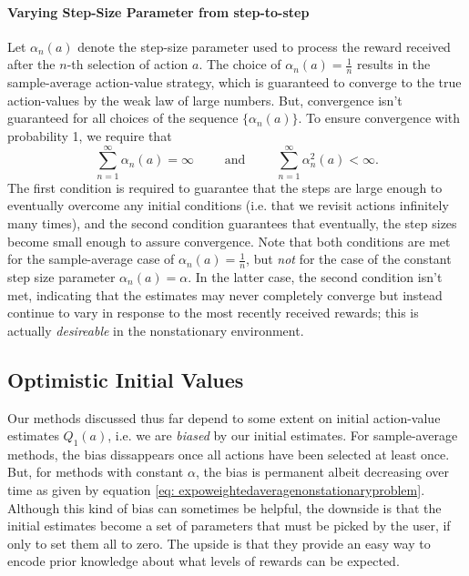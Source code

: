 \documentclass[12pt]{article}
\begin{document}
\paragraph{Varying Step-Size Parameter from step-to-step} Let $\alpha_n(a)$ denote the step-size parameter used to process the reward received after the $n$-th selection of action $a$. The choice of $\alpha_n(a) = \frac{1}{n}$ results in the sample-average action-value strategy, which is guaranteed to converge to the true action-values by the weak law of large numbers. But, convergence isn't guaranteed for all choices of the sequence $\{\alpha_n(a)\}$. To ensure convergence with probability 1, we require that
\begin{equation}
  \sum_{n=1}^{\infty} \alpha_n(a) = \infty \hspace{25pt} \textrm{ and } \hspace{25pt} \sum_{n=1}^{\infty} \alpha_n^2(a) < \infty.
\end{equation}
The first condition is required to guarantee that the steps are large enough to eventually overcome any initial conditions (i.e. that we revisit actions infinitely many times), and the second condition guarantees that eventually, the step sizes become small enough to assure convergence. Note that both conditions are met for the sample-average case of $\alpha_n(a) = \frac{1}{n}$, but \emph{not} for the case of the constant step size parameter $\alpha_n(a) = \alpha$. In the latter case, the second condition isn't met, indicating that the estimates may never completely converge but instead continue to vary in response to the most recently received rewards; this is actually \emph{desireable} in the nonstationary environment.

\subsection{Optimistic Initial Values} Our methods discussed thus far depend to some extent on initial action-value estimates $Q_1(a)$, i.e. we are \emph{biased} by our initial estimates. For sample-average methods, the bias dissappears once all actions have been selected at least once. But, for methods with constant $\alpha$, the bias is permanent albeit decreasing over time as given by equation \ref{eq: expoweightedaveragenonstationaryproblem}. Although this kind of bias can sometimes be helpful, the downside is that the initial estimates become a set of parameters that must be picked by the user, if only to set them all to zero. The upside is that they provide an easy way to encode prior knowledge about what levels of rewards can be expected.
\end{document}
